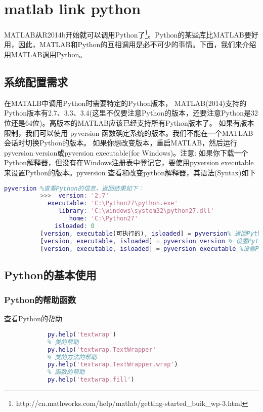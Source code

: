 \section{matlab link python}
    \par
    MATLAB从R2014b开始就可以调用Python了\footnote{http://cn.mathworks.com/help/matlab/getting-started\_buik\_wp-3.html}。Python的某些库比MATLAB要好用，因此，MATLAB和Python的互相调用是必不可少的事情。下面，我们来介绍用MATLAB调用Python。
    \subsection{系统配置需求}
        \par
        在MATALB中调用Python时需要特定的Python版本， MATLAB(2014)支持的Python版本有2.7、3.3、3.4(这里不仅要注意Python的版本，还要注意Python是32位还是64位)。高版本的MATLAB应该已经支持所有Python版本了。 如果有版本限制，我们可以使用 pyversion 函数确定系统的版本。我们不能在一个MATLAB会话时切换Python的版本。 如果你想改变版本，重启MATLAB，然后运行pyversion version或pyversion executable(for Windows)。注意: 如果你下载一个Python解释器，但没有在Windows注册表中登记它，要使用pyversion executable来设置Python的版本。pyversion 查看和改变python解释器，其语法(Syntax)如下
        \begin{lstlisting}[language = Matlab]
          pyversion %查看Python的信息，返回结果如下：
          >>>  version: '2.7'
            executable: 'C:\Python27\python.exe'
               library: 'C:\windows\system32\python27.dll'
                  home: 'C:\Python27'
              isloaded: 0
          [version, executable(可执行的), isloaded] = pyversion% 返回Python的信息
          [version, executable, isloaded] = pyversion version % 设置Python的路径
          [version, executable, isloaded] = pyversion executable %设置Python的路径
        \end{lstlisting}

    \subsection{Python的基本使用}
        \subsubsection{Python的帮助函数}
            \par
            查看Python的帮助
            \begin{lstlisting}[language = Matlab]
            % 包的帮助
            py.help('textwrap')
            % 类的帮助
            py.help('textwrap.TextWrapper'
            % 类的方法的帮助
            py.help('textwrap.TextWrapper.wrap')
            % 函数的帮助
            py.help('textwrap.fill')
            \end{lstlisting}
